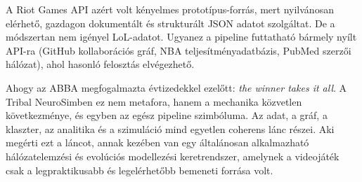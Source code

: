 A Riot Games API azért volt kényelmes prototípus-forrás, mert nyilvánosan elérhető, gazdagon dokumentált és strukturált JSON adatot szolgáltat. De a módszertan nem igényel LoL-adatot. Ugyanez a pipeline futtatható bármely nyílt API-ra (GitHub kollaborációs gráf, NBA teljesítményadatbázis, PubMed szerzői hálózat), ahol hasonló felosztás elvégezhető.

Ahogy az ABBA megfogalmazta évtizedekkel ezelőtt: \textit{the winner takes it all}.
A Tribal NeuroSimben ez nem metafora, hanem a mechanika közvetlen következménye, és egyben az egész pipeline szimbóluma. Az adat, a gráf, a klaszter, az analitika és a szimuláció mind egyetlen coherens lánc részei. Aki megérti ezt a láncot, annak kezében van egy általánosan alkalmazható hálózatelemzési és evolúciós modellezési keretrendszer, amelynek a videojáték csak a legpraktikusabb és legelérhetőbb bemeneti forrása volt.
